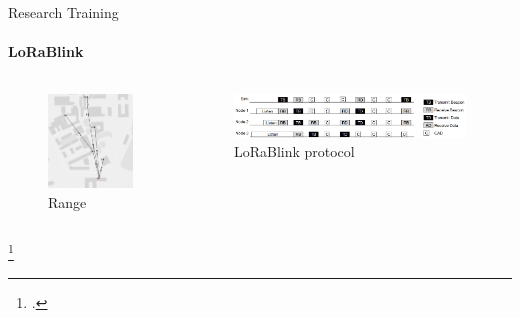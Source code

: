 \begin{frame}{Research Training}
\framesubtitle{LoRaBlink}
\begin{columns}
\begin{column}{0.3\textwidth}
\begin{figure}[H]
    \centering
    \includegraphics[width=1\textwidth]{presentation.tex/fig/lorablink2.png}
    \caption{Range\footnotemark}
\end{figure}
\end{column}
\begin{column}{0.7\textwidth}
\begin{figure}[H]
    \centering
    \includegraphics[width=0.98\textwidth]{presentation.tex/fig/lorablink.png}
    \caption{LoRaBlink protocol\footnotemark}
\end{figure}
\end{column}
\end{columns}
\footcitetext{lorablink}
\end{frame}
